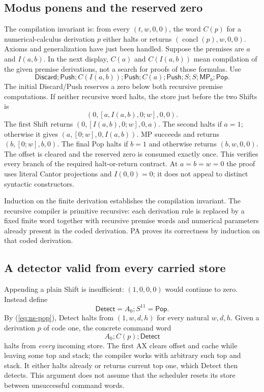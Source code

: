 \subsection{Modus ponens and the reserved zero}

The compilation invariant is: from every $(t,w,0,0)$, the word $C(p)$
for a numerical-calculus derivation $p$ either halts or returns
$(\operatorname{concl}(p),w,0,0)$.
Axioms and generalization have just been handled. Suppose the premises
are $a$ and $I(a,b)$. In the next display, $C(a)$ and $C(I(a,b))$
mean compilation of the given premise derivations, not a search for proofs
of those formulas. Use
\begin{equation}
 \mathsf{Discard};\mathsf{Push};C(I(a,b));\mathsf{Push};
 C(a);\mathsf{Push};S;S;\mathsf{MP}_b;\mathsf{Pop}.
 \label{eq:ns-mp-word}
\end{equation}
The initial Discard/Push reserves a zero below both recursive premise
computations. If neither recursive word halts, the store just before the
two Shifts is
\[
                  (0,[a,I(a,b),0;w],0,0).
\]
The first Shift returns $(0,[I(a,b),0;w],0,a)$. The second halts if
$a=1$; otherwise it gives $(a,[0;w],0,I(a,b))$. MP succeeds and returns
$(b,[0;w],b,0)$. The final Pop halts if $b=1$ and otherwise returns
$(b,w,0,0)$. The offset is cleared and the reserved zero is consumed
exactly once. This verifies every branch of the required halt-or-return
contract. At $a=b=w=0$ the proof uses literal Cantor projections and
$I(0,0)=0$; it does not appeal to distinct syntactic constructors.

Induction on the finite derivation establishes the compilation invariant.
The recursive compiler is primitive recursive: each derivation rule is
replaced by a fixed finite word together with recursive premise words and
numerical parameters already present in the coded derivation. PA proves
its correctness by induction on that coded derivation.

\subsection{A detector valid from every carried store}

Appending a plain Shift is insufficient: $(1,0,0,0)$ would continue to
zero. Instead define
\[
                 \mathsf{Detect}=A_0;S^{11}=\mathsf{Pop}.
\]
By (\ref{eq:ns-pop}), Detect halts from $(1,w,d,h)$ for every natural
$w,d,h$. Given a derivation $p$ of code one, the concrete command word
\[
                     A_0;C(p);\mathsf{Detect}
 \label{eq:ns-universal-word}
\]
halts from \emph{every} incoming store. The first AX clears offset and
cache while leaving some top and stack; the compiler works with arbitrary
such top and stack. It either halts already or returns current top one,
which Detect then detects. This argument does not assume that the
scheduler resets its store between unsuccessful command words.

